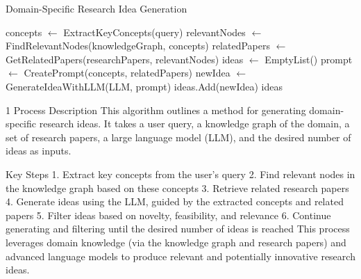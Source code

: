 \begin{algorithm}
    \caption{Domain-Specific Research Idea Generation}
    \begin{algorithmic}[1]
        \State concepts $\gets$ ExtractKeyConcepts(query)
        \State relevantNodes $\gets$ FindRelevantNodes(knowledgeGraph, concepts)
        \State relatedPapers $\gets$ GetRelatedPapers(researchPapers, relevantNodes)
        \State ideas $\gets$ EmptyList()
            \State prompt $\gets$ CreatePrompt(concepts, relatedPapers)
            \State newIdea $\gets$ GenerateIdeaWithLLM(LLM, prompt)
                \State ideas.Add(newIdea)
            \EndIf
        \EndWhile
        \State \Return ideas
    \EndProcedure
    \end{algorithmic}
    \end{algorithm}


1 Process Description
This algorithm outlines a method for generating domain-specific research ideas.
It takes a user query, a knowledge graph of the domain, a set of research papers,
a large language model (LLM), and the desired number of ideas as inputs.

Key Steps
1. Extract key concepts from the user’s query
2. Find relevant nodes in the knowledge graph based on these concepts
3. Retrieve related research papers
4. Generate ideas using the LLM, guided by the extracted concepts and
related papers
5. Filter ideas based on novelty, feasibility, and relevance
6. Continue generating and filtering until the desired number of ideas is
reached
This process leverages domain knowledge (via the knowledge graph and research papers) and advanced language models to produce relevant and potentially innovative research ideas.